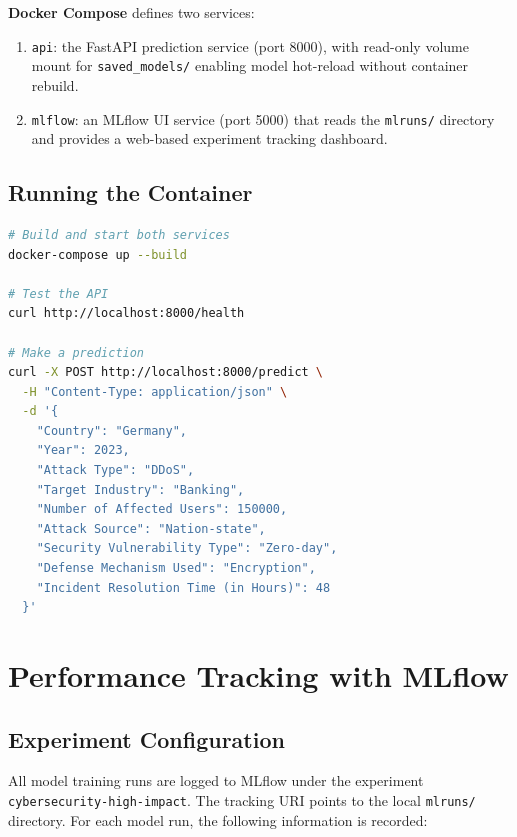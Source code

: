 \documentclass[a4paper,12pt]{article}
\begin{document}
\textbf{Docker Compose} defines two services:
\begin{enumerate}[leftmargin=2cm]
    \item \texttt{api}: the FastAPI prediction service (port 8000), with read-only volume mount for \texttt{saved\_models/} enabling model hot-reload without container rebuild.
    \item \texttt{mlflow}: an MLflow UI service (port 5000) that reads the \texttt{mlruns/} directory and provides a web-based experiment tracking dashboard.
\end{enumerate}

\subsection{Running the Container}

\begin{lstlisting}[language=bash]
# Build and start both services
docker-compose up --build

# Test the API
curl http://localhost:8000/health

# Make a prediction
curl -X POST http://localhost:8000/predict \
  -H "Content-Type: application/json" \
  -d '{
    "Country": "Germany",
    "Year": 2023,
    "Attack Type": "DDoS",
    "Target Industry": "Banking",
    "Number of Affected Users": 150000,
    "Attack Source": "Nation-state",
    "Security Vulnerability Type": "Zero-day",
    "Defense Mechanism Used": "Encryption",
    "Incident Resolution Time (in Hours)": 48
  }'
\end{lstlisting}

\section{Performance Tracking with MLflow}
\label{sec:mlflow}

\subsection{Experiment Configuration}

All model training runs are logged to MLflow under the experiment \texttt{cybersecurity-high-impact}. The tracking URI points to the local \texttt{mlruns/} directory. For each model run, the following information is recorded:
\end{document}
